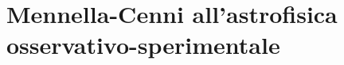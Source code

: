 \chapter[Astrofisica osservativo-sperimentale]{Mennella-Cenni all'astrofisica osservativo-sperimentale}